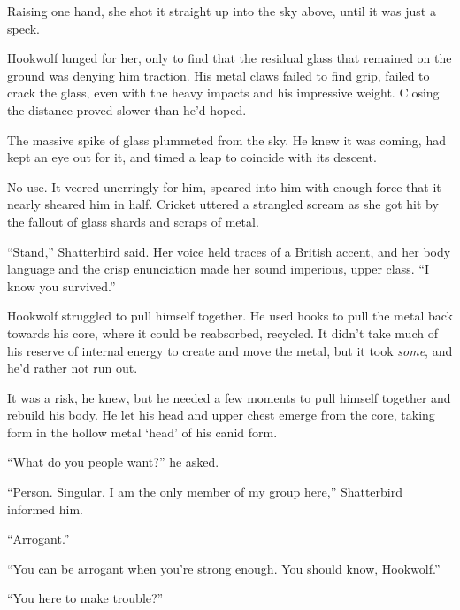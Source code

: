 Raising one hand, she shot it straight up into the sky above, until it was just a speck.



Hookwolf lunged for her, only to find that the residual glass that remained on the ground was denying him traction.  His metal claws failed to find grip, failed to crack the glass, even with the heavy impacts and his impressive weight.  Closing the distance proved slower than he'd hoped.



The massive spike of glass plummeted from the sky.  He knew it was coming, had kept an eye out for it, and timed a leap to coincide with its descent.



No use.  It veered unerringly for him, speared into him with enough force that it nearly sheared him in half.  Cricket uttered a strangled scream as she got hit by the fallout of glass shards and scraps of metal.



``Stand,'' Shatterbird said.  Her voice held traces of a British accent, and her body language and the crisp enunciation made her sound imperious, upper class.    ``I know you survived.''



Hookwolf struggled to pull himself together.  He used hooks to pull the metal back towards his core, where it could be reabsorbed, recycled.  It didn't take much of his reserve of internal energy to create and move the metal, but it took \emph{some}, and he'd rather not run out.



It was a risk, he knew, but he needed a few moments to pull himself together and rebuild his body.  He let his head and upper chest emerge from the core, taking form in the hollow metal `head' of his canid form.



``What do you people want?'' he asked.



``Person.  Singular.  I am the only member of my group here,'' Shatterbird informed him.



``Arrogant.''



``You can be arrogant when you're strong enough.  You should know, Hookwolf.''



``You here to make trouble?''



